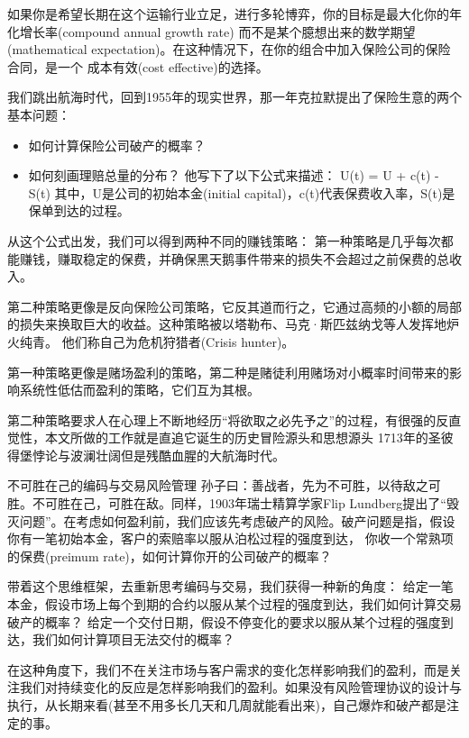 \documentclass[
  oneside]{book}
\providecommand{\tightlist}{%
  \setlength{\itemsep}{0pt}\setlength{\parskip}{0pt}}
\begin{document}
如果你是希望长期在这个运输行业立足，进行多轮博弈，你的目标是最大化你的年化增长率(compound annual growth rate)
而不是某个臆想出来的数学期望(mathematical expectation)。在这种情况下，在你的组合中加入保险公司的保险合同，是一个
成本有效(cost effective)的选择。

我们跳出航海时代，回到1955年的现实世界，那一年克拉默提出了保险生意的两个基本问题：

\begin{itemize}
\tightlist
\item
  如何计算保险公司破产的概率？
\item
  如何刻画理赔总量的分布？
  他写下了以下公式来描述：
  U(t) = U + c(t) - S(t)
  其中，U是公司的初始本金(initial capital)，c(t)代表保费收入率，S(t)是保单到达的过程。
\end{itemize}

从这个公式出发，我们可以得到两种不同的赚钱策略：
第一种策略是几乎每次都能赚钱，赚取稳定的保费，并确保黑天鹅事件带来的损失不会超过之前保费的总收入。

第二种策略更像是反向保险公司策略，它反其道而行之，它通过高频的小额的局部的损失来换取巨大的收益。这种策略被以塔勒布、马克·斯匹兹纳戈等人发挥地炉火纯青。
他们称自己为危机狩猎者(Crisis hunter)。

第一种策略更像是赌场盈利的策略，第二种是赌徒利用赌场对小概率时间带来的影响系统性低估而盈利的策略，它们互为其根。

第二种策略要求人在心理上不断地经历``将欲取之必先予之''的过程，有很强的反直觉性，本文所做的工作就是直追它诞生的历史冒险源头和思想源头
1713年的圣彼得堡悖论与波澜壮阔但是残酷血腥的大航海时代。

不可胜在己的编码与交易风险管理
孙子曰：善战者，先为不可胜，以待敌之可胜。不可胜在己，可胜在敌。同样，1903年瑞士精算学家Flip Lundberg提出了``毁灭问题''。在考虑如何盈利前，我们应该先考虑破产的风险。破产问题是指，假设你有一笔初始本金，客户的索赔率以服从泊松过程的强度到达，
你收一个常熟项的保费(preimum rate)，如何计算你开的公司破产的概率？

带着这个思维框架，去重新思考编码与交易，我们获得一种新的角度：
给定一笔本金，假设市场上每个到期的合约以服从某个过程的强度到达，我们如何计算交易破产的概率？
给定一个交付日期，假设不停变化的要求以服从某个过程的强度到达，我们如何计算项目无法交付的概率？

在这种角度下，我们不在关注市场与客户需求的变化怎样影响我们的盈利，而是关注我们对持续变化的反应是怎样影响我们的盈利。如果没有风险管理协议的设计与执行，从长期来看(甚至不用多长几天和几周就能看出来)，自己爆炸和破产都是注定的事。
\end{document}

